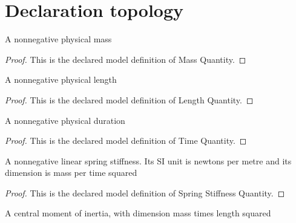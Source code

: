 \section{Declaration topology}
\begin{definition}
  \label{def:physics:phyx-mini-0267:phyxminiproblems-problemphyxmini0267-massquantity}
  A nonnegative physical mass
\end{definition}
\begin{proof}
  This is the declared model definition of Mass Quantity.
\end{proof}
\begin{definition}
  \label{def:physics:phyx-mini-0267:phyxminiproblems-problemphyxmini0267-lengthquantity}
  A nonnegative physical length
\end{definition}
\begin{proof}
  This is the declared model definition of Length Quantity.
\end{proof}
\begin{definition}
  \label{def:physics:phyx-mini-0267:phyxminiproblems-problemphyxmini0267-timequantity}
  A nonnegative physical duration
\end{definition}
\begin{proof}
  This is the declared model definition of Time Quantity.
\end{proof}
\begin{definition}
  \label{def:physics:phyx-mini-0267:phyxminiproblems-problemphyxmini0267-springstiffnessquantity}
  A nonnegative linear spring stiffness. Its SI unit is newtons per metre and its dimension is mass per time squared
\end{definition}
\begin{proof}
  This is the declared model definition of Spring Stiffness Quantity.
\end{proof}
\begin{definition}
  \label{def:physics:phyx-mini-0267:phyxminiproblems-problemphyxmini0267-momentofinertiaquantity}
  A central moment of inertia, with dimension mass times length squared
\end{definition}
